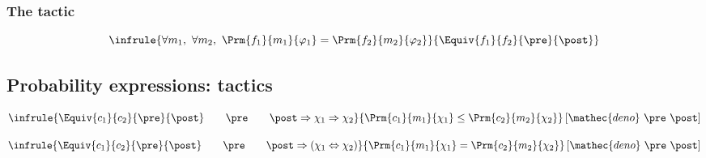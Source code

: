 \subsubsection*{The  tactic}
%

\begin{displaymath}
\infrule{
  \forall m_1,\ \forall m_2,\ 
  \Prm{f_1}{m_1}{\varphi_1} = \Prm{f_2}{m_2}{\varphi_2}
}{
  \Equiv{f_1}{f_2}{\pre}{\post}
}
\end{displaymath}









\subsection{Probability expressions:  tactics}


\begin{displaymath}
\infrule{
  \Equiv{c_1}{c_2}{\pre}{\post} 
  \qquad
  \pre
  \qquad
  \post \Rightarrow \chi_1 \Rightarrow \chi_2
}{
  \Prm{c_1}{m_1}{\chi_1} \leq \Prm{c_2}{m_2}{\chi_2}
}\left[\mathec{deno}\ \pre\ \post\right]
\end{displaymath}

\begin{displaymath}
\infrule{
  \Equiv{c_1}{c_2}{\pre}{\post} 
  \qquad
  \pre
  \qquad
  \post \Rightarrow (\chi_1 \Leftrightarrow \chi_2)
}{
  \Prm{c_1}{m_1}{\chi_1} = \Prm{c_2}{m_2}{\chi_2}
}\left[\mathec{deno}\ \pre\ \post\right]
\end{displaymath}



